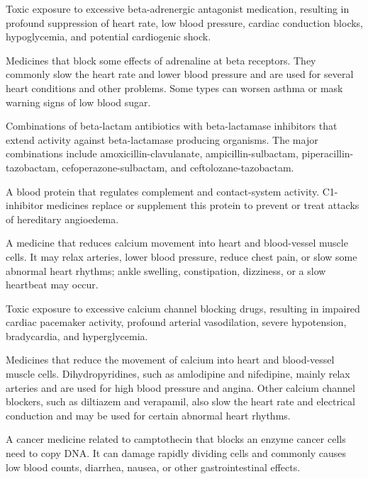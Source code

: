  Toxic exposure to excessive beta-adrenergic antagonist medication, resulting in profound suppression of heart rate, low blood pressure, cardiac conduction blocks, hypoglycemia, and potential cardiogenic shock.

 Medicines that block some effects of adrenaline at beta receptors. They commonly slow the heart rate and lower blood pressure and are used for several heart conditions and other problems. Some types can worsen asthma or mask warning signs of low blood sugar.

 Combinations of beta-lactam antibiotics with beta-lactamase inhibitors that extend
activity against beta-lactamase producing organisms. The major combinations include
amoxicillin-clavulanate, ampicillin-sulbactam, piperacillin-tazobactam,
cefoperazone-sulbactam, and ceftolozane-tazobactam.


 A blood protein that regulates complement and contact-system activity. C1-inhibitor medicines replace or supplement this protein to prevent or treat attacks of hereditary angioedema.

 A medicine that reduces calcium movement into heart and blood-vessel muscle cells. It may relax arteries, lower blood pressure, reduce chest pain, or slow some abnormal heart rhythms; ankle swelling, constipation, dizziness, or a slow heartbeat may occur.

 Toxic exposure to excessive calcium channel blocking drugs, resulting in impaired cardiac pacemaker activity, profound arterial vasodilation, severe hypotension, bradycardia, and hyperglycemia.

 Medicines that reduce the movement of calcium into heart and blood-vessel muscle cells. Dihydropyridines, such as amlodipine and nifedipine, mainly relax arteries and are used for high blood pressure and angina. Other calcium channel blockers, such as diltiazem and verapamil, also slow the heart rate and electrical conduction and may be used for certain abnormal heart rhythms.

 A cancer medicine related to camptothecin that blocks an enzyme cancer cells need to copy DNA. It can damage rapidly dividing cells and commonly causes low blood counts, diarrhea, nausea, or other gastrointestinal effects.

